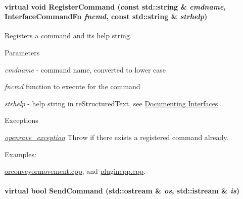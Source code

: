 \hypertarget{classOpenRAVE_1_1InterfaceBase_a840776899a1d3677582fc6ef87be6ef2}{
\paragraph[{RegisterCommand}]{\setlength{\rightskip}{0pt plus 5cm}virtual void RegisterCommand (const std::string \& {\em cmdname}, \/  {\bf InterfaceCommandFn} {\em fncmd}, \/  const std::string \& {\em strhelp})}\hfill}
\label{classOpenRAVE_1_1InterfaceBase_a840776899a1d3677582fc6ef87be6ef2}


Registers a command and its help string. 


\begin{DoxyParams}{Parameters}
\item[{\em cmdname}]-\/ command name, converted to lower case \item[{\em fncmd}]function to execute for the command \item[{\em strhelp}]-\/ help string in reStructuredText, see \hyperlink{writing__plugins_writing_plugins_doc}{Documenting Interfaces}. \end{DoxyParams}

\begin{DoxyExceptions}{Exceptions}
\item[{\em \hyperlink{classOpenRAVE_1_1openrave__exception}{openrave\_\-exception}}]Throw if there exists a registered command already. \end{DoxyExceptions}
\begin{Desc}
\item[Examples: ]\par
\hyperlink{orconveyormovement_8cpp-example}{orconveyormovement.cpp}, and \hyperlink{plugincpp_8cpp-example}{plugincpp.cpp}.\end{Desc}
\hypertarget{classOpenRAVE_1_1InterfaceBase_a1293cda647f18fe751e66b910af52407}{
\paragraph[{SendCommand}]{\setlength{\rightskip}{0pt plus 5cm}virtual bool SendCommand (std::ostream \& {\em os}, \/  std::istream \& {\em is})}\hfill}
\label{classOpenRAVE_1_1InterfaceBase_a1293cda647f18fe751e66b910af52407}


